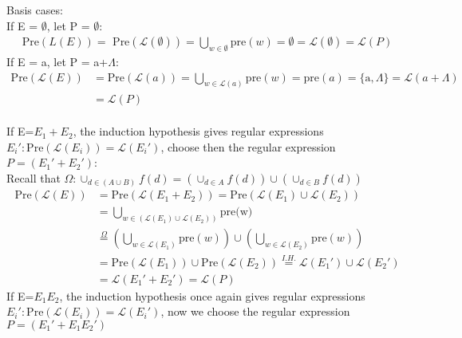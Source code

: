 \documentclass{article}
\theoremstyle{remark}
\numberwithin{equation}{section}
\begin{document}
	\noindent Basis cases:\\
	If E = $\emptyset$, let P = $\emptyset$:
	\begin{align*}
	\text{Pre}(L(E))=\text{ Pre}(\mathcal{L(\emptyset)})=\bigcup_{w\in\emptyset}\text{pre}(w) = \emptyset =\mathcal{L}(\emptyset)=\mathcal{L}(P)
	\end{align*}
	If E = a, let P = a+$\Lambda$:
	\begin{align*}
	\text{Pre}(\mathcal{L}(E))&=\text{Pre}(\mathcal{L}(a)) = \bigcup_{w\in\mathcal{L}(a)}\text{pre}(w) = \text{pre}(a)= \{ \text{a}, \Lambda \} = \mathcal{L}(a + \Lambda)
	\\&=\mathcal{L}(P)
	\end{align*}
	\\
	If E=$E_1+E_2$, the induction hypothesis gives regular expressions $E_i':\text{Pre}(\mathcal{L}(E_i))=\mathcal{L}(E_i')$, choose then the regular expression $P=(E_1'+E_2')$:
	\\Recall that $\Omega: \cup_{d \in (A\cup B)}f(d) = (\cup_{d\in A}f(d)) \cup (\cup_{d\in B}f(d))$
	\begin{align*}
	\text{Pre}(\mathcal{L}(E)) &= \text{Pre} (\mathcal{L}(E_{1} + E_{2}) ) = \text{Pre} 
	(\mathcal{L}(E_{1}) \cup \mathcal{L}(E_{2})) \\
	&= \bigcup_{w\in (\mathcal{L}(E_{1}) \cup \mathcal{L}(E_{2}))} \text{pre(w)}
	\\&\stackrel{\Omega}{=} \left( \bigcup_{w\in \mathcal{L}(E_1)} \text{pre}(w) \right) \cup \left( \bigcup_{w\in \mathcal{L}(E_2)} \text{pre}(w) \right)\\
	&= \text{Pre}(\mathcal{L}(E_{1}))\cup \text{Pre}(\mathcal{L}(E_{2}))\stackrel{I.H.}{=} \mathcal{L}(E_{1}')\cup \mathcal{L}(E_{2}') \\ &= \mathcal{L}(E_1'+E_2') = \mathcal{L}(P)
	\end{align*}
	If E=$E_{1}E_{2}$, the induction hypothesis once again gives regular expressions $E_i':\text{Pre}(\mathcal{L}(E_i))=\mathcal{L}(E_i')$, now we choose the regular expression $P=(E_1'+E_1E_2')$
\end{document}
